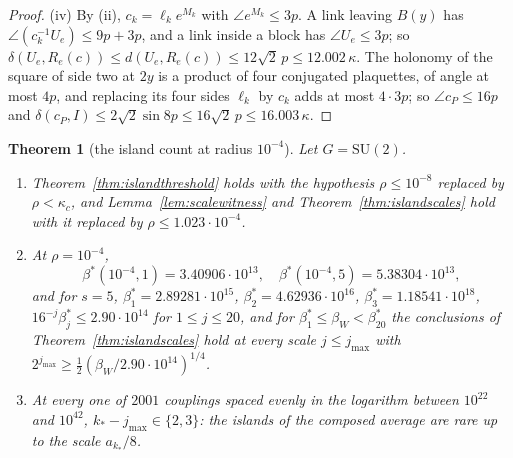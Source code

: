 \documentclass[11pt]{amsart}
\newtheorem{theorem}{Theorem}[section]
\theoremstyle{definition}
\theoremstyle{remark}
\numberwithin{equation}{section}
\newcommand{\SU}{\mathrm{SU}}
\begin{document}
\begin{proof}
(iv) By (ii), $c_k=\ell_ke^{M_k}$ with $\angle e^{M_k}\le3p$. A link leaving
$B(y)$ has $\angle(c_k^{-1}U_e)\le9p+3p$, and a link inside a block has
$\angle U_e\le3p$; so $\delta(U_e,R_e(c))\le d(U_e,R_e(c))\le12\sqrt2\,p
\le12.002\,\kappa$. The
holonomy of the square of side two at $2y$ is a product of four conjugated
plaquettes, of angle at most $4p$, and replacing its four sides $\ell_k$
by $c_k$ adds at most $4\cdot3p$; so $\angle c_P\le16p$ and $\delta(c_P,I)
\le2\sqrt2\sin8p\le16\sqrt2\,p\le16.003\,\kappa$.
\end{proof}

\begin{theorem}[the island count at radius $10^{-4}$]\label{thm:islandswide}
Let $G=\SU(2)$.
\begin{enumerate}[label=\textup{(\roman*)},leftmargin=*]
\item Theorem~\ref{thm:islandthreshold} holds with the hypothesis $\rho\le
10^{-8}$ replaced by $\rho<\kappa_c$, and Lemma~\ref{lem:scalewitness} and
Theorem~\ref{thm:islandscales} hold with it replaced by $\rho\le1.023\cdot
10^{-4}$.
\item At $\rho=10^{-4}$,
\[
\beta^*(10^{-4},1)=3.40906\cdot10^{13},\quad
\beta^*(10^{-4},5)=5.38304\cdot10^{13},
\]
and for $s=5$, $\beta^*_1=2.89281\cdot10^{15}$, $\beta^*_2=4.62936\cdot
10^{16}$, $\beta^*_3=1.18541\cdot10^{18}$,
$16^{-j}\beta^*_j\le2.90\cdot10^{14}$ for $1\le j\le20$, and for $\beta^*_1
\le\beta_W<\beta^*_{20}$ the conclusions of Theorem~\ref{thm:islandscales}
hold at every scale $j\le j_{\max}$ with $2^{j_{\max}}\ge\frac12(\beta_W/2.90
\cdot10^{14})^{1/4}$.
\item At every one of $2001$ couplings spaced evenly in the logarithm between
$10^{22}$ and $10^{42}$, $k_*-j_{\max}\in\{2,3\}$: the islands of the
composed average are rare up to the scale $a_{k_*}/8$.
\end{enumerate}
\end{theorem}
\end{document}
